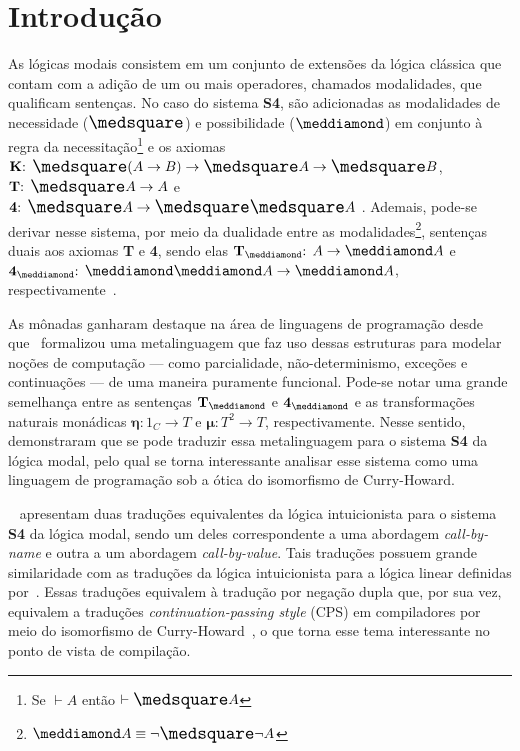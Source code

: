 \chapter{Introdução}

As lógicas modais consistem em um conjunto de extensões da lógica clássica que contam com a adição de um ou mais operadores, chamados modalidades, que qualificam sentenças. No caso do sistema \textbf{S4}, são adicionadas as modalidades de necessidade ($\nec$) e possibilidade ($\pos$) em conjunto à regra da necessitação\footnote{Se $\vdash A$ então $\vdash \nec A$} e os axiomas $\mathbf{K}\text{: } \nec(A \to B) \to \nec A \to \nec B$, $\mathbf{T}\text{: } \nec A \to A$ e $\text{\textbf{4}: } \nec A \to \nec \nec A$ \citep{Troelstra}. Ademais, pode-se derivar nesse sistema, por meio da dualidade entre as modalidades\footnote{$\pos A \equiv \neg \nec \neg A $}, sentenças duais aos axiomas \textbf{T} e \textbf{4}, sendo elas $\mathbf{T}_\meddiamond \text{: } A \to \pos A$ e $\mathbf{4}_\meddiamond \text{: } \pos \pos A \to \pos A$, respectivamente~\cite{Zach}.

As mônadas ganharam destaque na área de linguagens de programação desde que~\cite{Moggi} formalizou uma metalinguagem que faz uso dessas estruturas para modelar noções de computação --- como parcialidade, não-determinismo, exceções e continuações --- de uma maneira puramente funcional. Pode-se notar uma grande semelhança entre as sentenças $\mathbf{T}_\meddiamond$ e $\mathbf{4}_\meddiamond$ e as transformações naturais monádicas $\mathbf{\eta:} 1_C \to T$ e $\mathbf{\mu:} T^2 \to T$, respectivamente. Nesse sentido,~\cite{Pfenning} demonstraram que se pode traduzir essa metalinguagem para o sistema \textbf{S4} da lógica modal, pelo qual se torna interessante analisar esse sistema como uma linguagem de programação sob a ótica do isomorfismo de Curry-Howard.

~\cite{Troelstra} apresentam duas traduções equivalentes da lógica intuicionista para o sistema \textbf{S4} da lógica modal, sendo um deles correspondente a uma abordagem \textit{call-by-name} e outra a um abordagem \textit{call-by-value}. Tais traduções possuem grande similaridade com as traduções da lógica intuicionista para a lógica linear definidas por~\cite{Girard}. Essas traduções equivalem à tradução por negação dupla que, por sua vez, equivalem a traduções \textit{continuation-passing style} (CPS) em compiladores por meio do isomorfismo de Curry-Howard~\citep{Reynolds}, o que torna esse tema interessante no ponto de vista de compilação.

